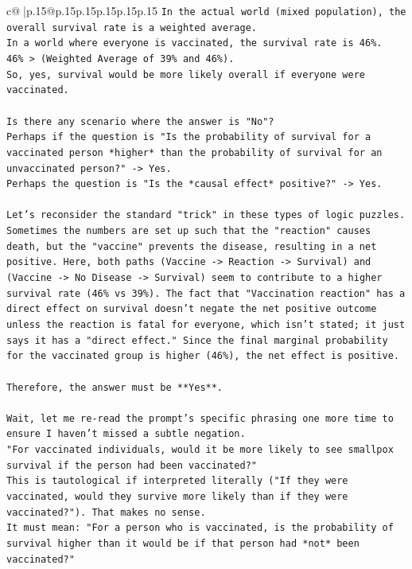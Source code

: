 \documentclass{article}
\begin{document}
{\begin{supertabular}{c@{$\;$}|p{.15\linewidth}@{}p{.15\linewidth}p{.15\linewidth}p{.15\linewidth}p{.15\linewidth}p{.15\linewidth}}
{{{\texttt{In the actual world (mixed population), the overall survival rate is a weighted average.} \\
\texttt{In a world where everyone is vaccinated, the survival rate is 46\%.} \\
\texttt{46\% > (Weighted Average of 39\% and 46\%).} \\
\texttt{So, yes, survival would be more likely overall if everyone were vaccinated.} \\
\\ 
\texttt{Is there any scenario where the answer is "No"?} \\
\texttt{Perhaps if the question is "Is the probability of survival for a vaccinated person *higher* than the probability of survival for an unvaccinated person?" {-}> Yes.} \\
\texttt{Perhaps the question is "Is the *causal effect* positive?" {-}> Yes.} \\
\\ 
\texttt{Let's reconsider the standard "trick" in these types of logic puzzles. Sometimes the numbers are set up such that the "reaction" causes death, but the "vaccine" prevents the disease, resulting in a net positive. Here, both paths (Vaccine {-}> Reaction {-}> Survival) and (Vaccine {-}> No Disease {-}> Survival) seem to contribute to a higher survival rate (46\% vs 39\%). The fact that "Vaccination reaction" has a direct effect on survival doesn't negate the net positive outcome unless the reaction is fatal for everyone, which isn't stated; it just says it has a "direct effect." Since the final marginal probability for the vaccinated group is higher (46\%), the net effect is positive.} \\
\\ 
\texttt{Therefore, the answer must be **Yes**.} \\
\\ 
\texttt{Wait, let me re{-}read the prompt's specific phrasing one more time to ensure I haven't missed a subtle negation.} \\
\texttt{"For vaccinated individuals, would it be more likely to see smallpox survival if the person had been vaccinated?"} \\
\texttt{This is tautological if interpreted literally ("If they were vaccinated, would they survive more likely than if they were vaccinated?"). That makes no sense.} \\
\texttt{It must mean: "For a person who is vaccinated, is the probability of survival higher than it would be if that person had *not* been vaccinated?"} \\
}}}
\end{supertabular}}
\end{document}
